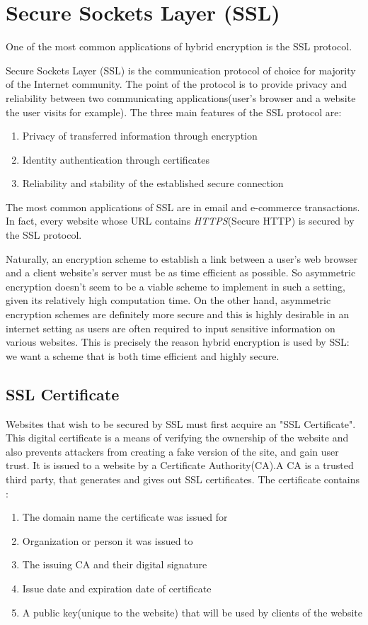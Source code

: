 \section{Secure Sockets Layer (SSL)}
One of the most common applications of hybrid encryption is the SSL protocol.

\cite{mckinley}
Secure Sockets Layer (SSL) is the communication protocol of choice for majority of the Internet community. The point of the protocol is to provide privacy and reliability between two communicating applications(user's browser and a website the user visits for example). The three main features of the SSL protocol are:

\begin{enumerate}
    \item Privacy of transferred information through encryption
    \item Identity authentication through certificates
    \item Reliability and stability of the established secure connection
\end{enumerate}

The most common applications of SSL are in email and e-commerce transactions. In fact, every website whose URL contains \emph{HTTPS}(Secure HTTP) is secured by the SSL protocol.

Naturally, an encryption scheme to establish a link between a user's web browser and a client website's server must be as time efficient as possible. So asymmetric encryption doesn't seem to be a viable scheme to implement in such a setting, given its relatively high computation time. On the other hand, asymmetric encryption schemes are definitely more secure and this is highly desirable in an internet setting as users are often required to input sensitive information on various websites. This is precisely the reason hybrid encryption is used by SSL: we want a scheme that is both time efficient and highly secure.

\subsection{SSL Certificate} \cite{cloudflare}
Websites that wish to be secured by SSL must first acquire an "SSL Certificate". This digital certificate is a means of verifying the ownership of the website and also prevents attackers from creating a fake version of the site, and gain user trust. It is issued to a website by a Certificate Authority(CA).A CA is a trusted third party, that generates and gives out SSL certificates. The certificate contains :
\begin{enumerate}
    \item The domain name the certificate was issued for
    \item Organization or person it was issued to
    \item The issuing CA and their digital signature
    \item Issue date and expiration date of certificate
    \item A public key(unique to the website) that will be used by clients of the website
\end{enumerate}



